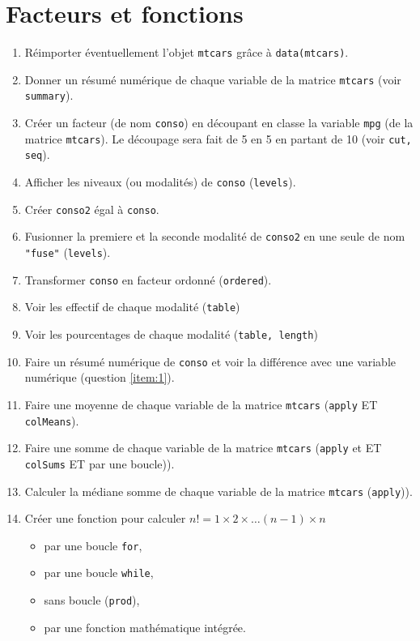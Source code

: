 \documentclass[a4paper,10pt,french]{article}
\newcommand{\code}[1]{\texttt{#1}}
\begin{document}
\section{Facteurs et fonctions}
\begin{enumerate}

\item Réimporter éventuellement l'objet \code{mtcars} grâce à \code{data(mtcars)}.
\item Donner un résumé numérique de chaque variable de la matrice
  \texttt{mtcars} (voir \texttt{summary})\label{item:1}. 
\item Créer un facteur (de nom \texttt{conso}) en découpant en classe
  la variable \texttt{mpg} (de la matrice \texttt{mtcars}). Le découpage sera fait de 5 en 5 en partant de 10 (voir \texttt{cut, seq}). 
\item Afficher les niveaux (ou modalités) de \texttt{conso} (\texttt{levels}). 
\item Créer \texttt{conso2} égal à \texttt{conso}.
\item Fusionner la premiere et la seconde modalité de  \texttt{conso2} en une seule de nom \texttt{"fuse"} (\texttt{levels}).
\item Transformer \texttt{conso} en facteur ordonné (\texttt{ordered}). 
\item Voir les effectif de chaque modalité (\texttt{table})
\item Voir les pourcentages de chaque modalité (\texttt{table, length})
\item Faire un résumé numérique de \texttt{conso} et voir la différence 
avec une variable numérique (question \ref{item:1}). 
\item Faire une moyenne de chaque variable de la matrice \texttt{mtcars} (\texttt{apply} ET \texttt{colMeans}). 
\item Faire une somme de chaque variable de la matrice \texttt{mtcars} (\texttt{apply} et  ET \texttt{colSums} ET par une boucle)). 
\item Calculer la médiane somme de chaque variable de la matrice \texttt{mtcars} (\texttt{apply})). 
\item Créer une fonction pour calculer $n!=1\times 2\times \ldots (n-1)\times n$
\begin{itemize}
\item par une boucle \texttt{for},
\item par une boucle \texttt{while},
\item sans boucle (\texttt{prod}),
\item par une fonction mathématique intégrée. 

\end{itemize}
\end{enumerate}
\end{document}
